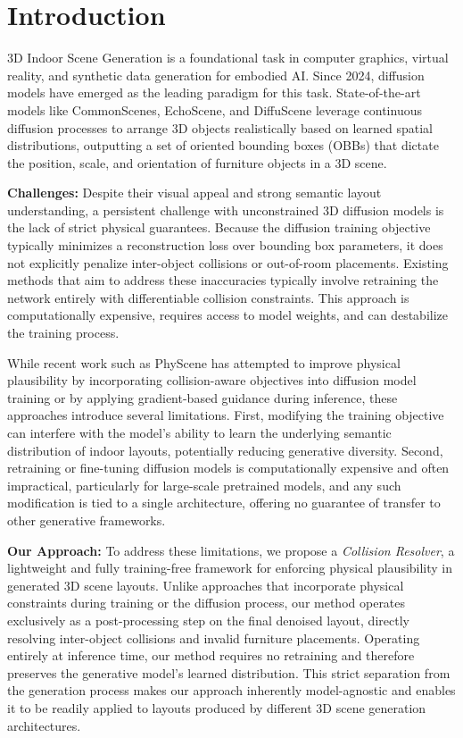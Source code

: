 \section{Introduction}
3D Indoor Scene Generation is a foundational task in computer graphics, virtual reality, and synthetic data generation for embodied AI. Since 2024, diffusion models have emerged as the leading paradigm for this task. State-of-the-art models like CommonScenes, \cite{zhai2023commonscenesgeneratingcommonsense3d} EchoScene, \cite{zhai2025echosceneindoorscenegeneration} and DiffuScene \cite{tang2024diffuscenedenoisingdiffusionmodels} leverage continuous diffusion processes to arrange 3D objects realistically based on learned spatial distributions, outputting a set of oriented bounding boxes (OBBs) that dictate the position, scale, and orientation of furniture objects in a 3D scene.

\textbf{Challenges:} Despite their visual appeal and strong semantic layout understanding, a persistent challenge with unconstrained 3D diffusion models is the lack of strict physical guarantees. Because the diffusion training objective typically minimizes a reconstruction loss over bounding box parameters, it does not explicitly penalize inter-object collisions or out-of-room placements. Existing methods that aim to address these inaccuracies typically involve retraining the network entirely with differentiable collision constraints. This approach is computationally expensive, requires access to model weights, and can destabilize the training process.

While recent work such as PhyScene \cite{yang2024physcenephysicallyinteractable3d} has attempted to improve physical plausibility by incorporating collision-aware objectives into diffusion model training or by applying gradient-based guidance during inference, these approaches introduce several limitations. First, modifying the training objective can interfere with the model's ability to learn the underlying semantic distribution of indoor layouts, potentially reducing generative diversity. Second, retraining or fine-tuning diffusion models is computationally expensive and often impractical, particularly for large-scale pretrained models, and any such modification is tied to a single architecture, offering no guarantee of transfer to other generative frameworks. 

\textbf{Our Approach:} To address these limitations, we propose a \textit{Collision Resolver}, a lightweight and fully training-free framework for enforcing physical plausibility in generated 3D scene layouts. Unlike approaches that incorporate physical constraints during training or the diffusion process, our method operates exclusively as a post-processing step on the final denoised layout, directly resolving inter-object collisions and invalid furniture placements. Operating entirely at inference time, our method requires no retraining and therefore preserves the generative model's learned distribution.
This strict separation from the generation process makes our approach inherently model-agnostic and enables it to be readily applied to layouts produced by different 3D scene generation architectures.

